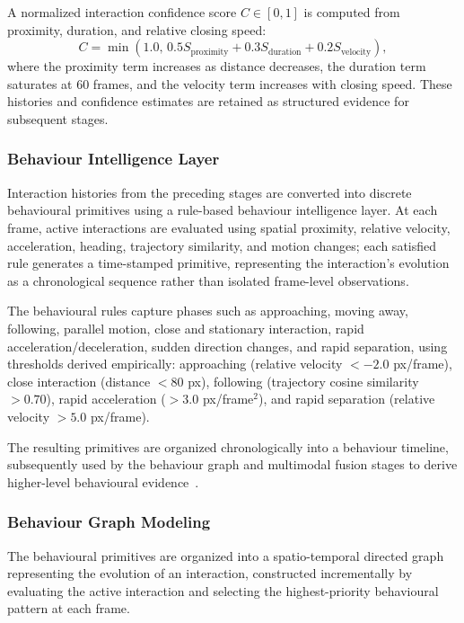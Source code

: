 \documentclass[runningheads]{llncs}
\begin{document}
A normalized interaction confidence score $C\in[0,1]$ is computed from
proximity, duration, and relative closing speed:
\begin{equation}
C =
\min\left(1.0,\,
0.5S_{\mathrm{proximity}}
+0.3S_{\mathrm{duration}}
+0.2S_{\mathrm{velocity}}\right),
\end{equation}
where the proximity term increases as distance decreases, the duration
term saturates at 60 frames, and the velocity term increases with closing
speed. These histories and confidence estimates are retained as
structured evidence for subsequent stages.
\subsubsection{Behaviour Intelligence Layer}
Interaction histories from the preceding stages are converted into
discrete behavioural primitives using a rule-based behaviour intelligence
layer. At each frame, active interactions are evaluated using spatial
proximity, relative velocity, acceleration, heading, trajectory
similarity, and motion changes; each satisfied rule generates a
time-stamped primitive, representing the interaction's evolution as a
chronological sequence rather than isolated frame-level observations.

The behavioural rules capture phases such as approaching, moving away,
following, parallel motion, close and stationary interaction, rapid
acceleration/deceleration, sudden direction changes, and rapid
separation, using thresholds derived empirically: approaching
(relative velocity $<-2.0$ px/frame), close interaction (distance
$<80$ px), following (trajectory cosine similarity $>0.70$), rapid
acceleration ($>3.0$ px/frame$^2$), and rapid separation (relative
velocity $>5.0$ px/frame).

The resulting primitives are organized chronologically into a behaviour
timeline, subsequently used by the behaviour graph and multimodal fusion
stages to derive higher-level behavioural evidence~\cite{yan2018stgcn}.

\subsubsection{Behaviour Graph Modeling}
The behavioural primitives are organized into a spatio-temporal directed
graph representing the evolution of an interaction, constructed
incrementally by evaluating the active interaction and selecting the
highest-priority behavioural pattern at each frame.
\end{document}
